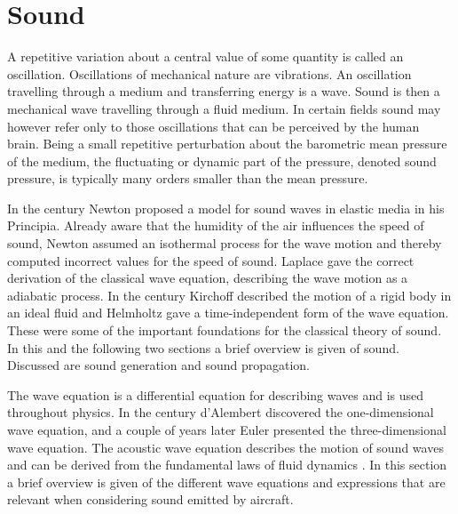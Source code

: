 \section{Sound}

A repetitive variation about a central value of some quantity is called an
oscillation. Oscillations of mechanical nature are vibrations. An
oscillation travelling through a medium and transferring energy is a wave. Sound
is then a mechanical wave travelling through a fluid medium.
In certain fields sound may however refer only to those oscillations that can be perceived by the human brain.
Being a small repetitive perturbation about the barometric
mean pressure of the medium, the fluctuating or dynamic part of the pressure,
denoted sound pressure, is typically many orders smaller than the mean
pressure.

In the  century Newton proposed a model for sound waves in elastic media
in his Principia. Already aware that the humidity of the air influences the
speed of sound, Newton assumed an isothermal process for the wave motion and
thereby computed incorrect values for the speed of sound. Laplace gave the
correct derivation of the classical wave equation, describing the wave motion as
a adiabatic process. In the  century Kirchoff described the motion of a
rigid body in an ideal fluid and Helmholtz gave a time-independent form of the
wave equation. These were some of the important foundations for the classical
theory of sound.
In this and the following two sections a brief overview is given of sound. Discussed are sound
generation and sound propagation.

The wave equation is a differential equation for describing waves and is used
throughout physics. In the  century d'Alembert discovered the
one-dimensional wave equation, and a couple of years later Euler presented the
three-dimensional wave equation. The acoustic wave equation describes the motion
of sound waves and can be derived from the fundamental laws of fluid dynamics \cite{Rienstra2017}.
In this section a brief overview is given of the different wave equations and
expressions that are relevant when considering sound emitted by aircraft.

